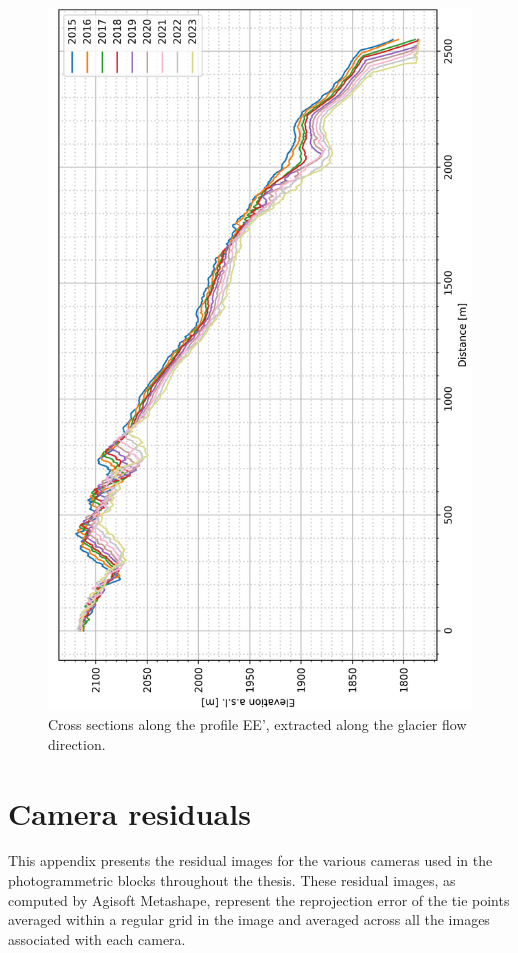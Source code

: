 \begin{figure}[p]
    \centering
\includegraphics[height=\textheight]{figures/appendix/profile_flow_rot.png}
    \caption[]{Cross sections along the profile EE', extracted along the glacier flow direction.}
\end{figure}

\chapter{Camera residuals}\label{app:camera_res}

This appendix presents the residual images for the various cameras used in the photogrammetric blocks throughout the thesis. 
These residual images, as computed by Agisoft Metashape, represent the reprojection error of the tie points averaged within a regular grid in the image and averaged across all the images associated with each camera.


